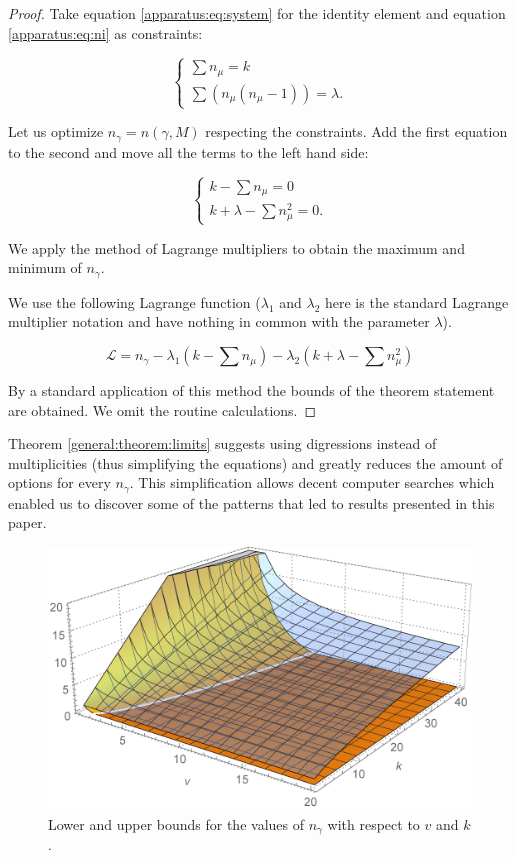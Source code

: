 \begin{proof}
	Take equation \eqref{apparatus:eq:system} for the identity element and equation \eqref{apparatus:eq:ni} as constraints:
	
	\begin{equation}
		\begin{cases}
			\sum {n_\mu} = k \\
			\sum (n_\mu(n_\mu-1)) = \lambda.
		\end{cases}
	\end{equation}
	
	Let us optimize $n_\gamma=n(\gamma,M)$ respecting the constraints. Add the first equation to the second and move all the terms to the left hand side:
	
	\begin{equation}
		\begin{cases}
			k - \sum {n_\mu} = 0 \\
			k + \lambda - \sum n_\mu^2 = 0.
		\end{cases}
	\end{equation}
	
	We apply the method of Lagrange multipliers to obtain the maximum and minimum of $n_\gamma$. 
	
	We use the following Lagrange function ($\lambda_1$ and $\lambda_2$ here is the standard Lagrange multiplier notation and have nothing in common with the parameter $\lambda$).
	
	\begin{equation}
		\mathcal L = n_\gamma - \lambda_1 (k - \sum n_\mu) - \lambda_2 (k + \lambda - \sum n_\mu^2)
	\end{equation}
	
	By a standard application of this method the bounds of the theorem statement are obtained. We omit the routine calculations.
\end{proof}

Theorem \ref{general:theorem:limits} suggests using digressions 
instead of multiplicities (thus simplifying the equations) and 
greatly reduces the amount of options for every $n_\gamma$. This 
simplification allows decent computer searches which enabled us to 
discover some of the patterns that led to results presented in this 
paper.
	
\begin{figure}
	\includegraphics[width=\textwidth]{assets/boundingSurfaces}
	\caption{Lower and upper bounds for the values of $n_\gamma$ with respect to $v$ and $k$.}
	\label{general:figure:limits}
\end{figure}

